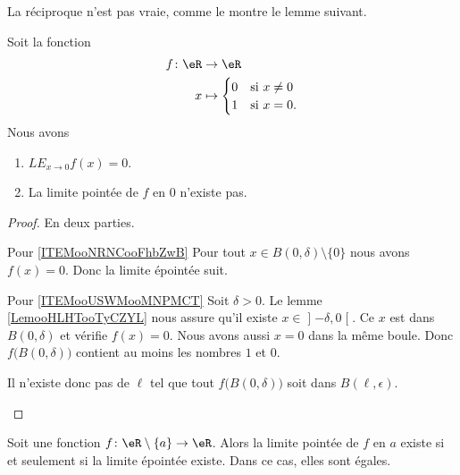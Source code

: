 La réciproque n'est pas vraie, comme le montre le lemme suivant.
\begin{lemma}     \label{LEMooOSNGooJpiXbK}
	Soit la fonction
	\begin{equation}
		\begin{aligned}
			f\colon \eR & \to \eR                            \\
			x           & \mapsto \begin{cases}
				0 & \text{si } x\neq 0 \\
				1 & \text{si }x=0.
			\end{cases}
		\end{aligned}
	\end{equation}
	Nous avons
	\begin{enumerate}
		\item       \label{ITEMooNRNCooFhbZwB}
		      \( {LE}_{x\to 0}f(x)=0\).
		\item       \label{ITEMooUSWMooMNPMCT}
		      La limite pointée de \( f\) en \( 0\) n'existe pas.
	\end{enumerate}
\end{lemma}

\begin{proof}
	En deux parties.
	\begin{subproof}
		\item[Pour \ref{ITEMooNRNCooFhbZwB}]
		Pour tout \( x\in B(0,\delta)\setminus\{ 0 \}\) nous avons \( f(x)=0\). Donc la limite épointée suit.
		\item[Pour \ref{ITEMooUSWMooMNPMCT}]
		Soit \( \delta>0\). Le lemme \ref{LemooHLHTooTyCZYL} nous assure qu'il existe \( x\in \mathopen] -\delta , 0 \mathclose[\). Ce \( x\) est dans \( B(0,\delta)\) et vérifie \( f(x)=0\). Nous avons aussi \( x=0\) dans la même boule. Donc \( f\big( B(0,\delta) \big)\) contient au moins les nombres \( 1\) et \( 0\).

		Il n'existe donc pas de \( \ell\) tel que tout \( f\big( B(0,\delta) \big)\) soit dans \( B(\ell, \epsilon)\).
	\end{subproof}
\end{proof}

\begin{lemma}\label{LEMooTPNEooRurTJJ}
	Soit une fonction \( f\colon \eR\setminus\{ a \}\to \eR\). Alors la limite pointée de \( f\) en \( a\) existe si et seulement si la limite épointée existe. Dans ce cas, elles sont égales.
\end{lemma}

